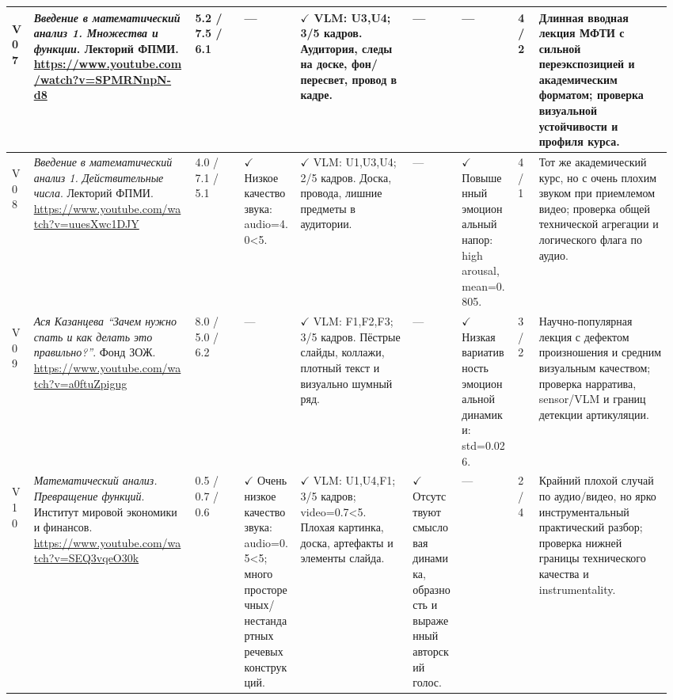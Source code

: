 \begin{landscape}
\begin{longtable}{
L{0.035\linewidth}
L{0.235\linewidth}|
L{0.075\linewidth}|
L{0.085\linewidth}
L{0.160\linewidth}
L{0.070\linewidth}
L{0.085\linewidth}|
L{0.035\linewidth}|
L{0.190\linewidth}
}
\midrule

\hypertarget{vid:v07}{V07} &
\textit{Введение в математический анализ 1. Множества и функции}. Лекторий ФПМИ. {\tiny\url{https://www.youtube.com/watch?v=SPMRNnpN-d8}} &
5.2 / 7.5 / 6.1 &
--- &
$\checkmark$ VLM: U3,U4; 3/5 кадров. Аудитория, следы на доске, фон/пересвет, провод в кадре. &
--- &
--- &
4 / 2 &
Длинная вводная лекция МФТИ с сильной переэкспозицией и академическим форматом; проверка визуальной устойчивости и профиля курса. \\

\midrule

\hypertarget{vid:v08}{V08} &
\textit{Введение в математический анализ 1. Действительные числа}. Лекторий ФПМИ. {\tiny\url{https://www.youtube.com/watch?v=uuesXwc1DJY}} &
4.0 / 7.1 / 5.1 &
$\checkmark$ Низкое качество звука: audio=4.0<5. &
$\checkmark$ VLM: U1,U3,U4; 2/5 кадров. Доска, провода, лишние предметы в аудитории. &
--- &
$\checkmark$ Повышенный эмоциональный напор: high arousal, mean=0.805. &
4 / 1 &
Тот же академический курс, но с очень плохим звуком при приемлемом видео; проверка общей технической агрегации и логического флага по аудио. \\

\midrule

\hypertarget{vid:v09}{V09} &
\textit{Ася Казанцева ``Зачем нужно спать и как делать это правильно?''}. Фонд ЗОЖ. {\tiny\url{https://www.youtube.com/watch?v=a0ftuZpigug}} &
8.0 / 5.0 / 6.2 &
--- &
$\checkmark$ VLM: F1,F2,F3; 3/5 кадров. Пёстрые слайды, коллажи, плотный текст и визуально шумный ряд. &
--- &
$\checkmark$ Низкая вариативность эмоциональной динамики: std=0.026.&
3 / 2 &
Научно-популярная лекция с дефектом произношения и средним визуальным качеством; проверка нарратива, sensor/VLM и границ детекции артикуляции. \\

\midrule

\hypertarget{vid:v10}{V10} &
\textit{Математический анализ. Превращение функций}. Институт мировой экономики и финансов. {\tiny\url{https://www.youtube.com/watch?v=SEQ3vqeO30k}} &
0.5 / 0.7 / 0.6 &
$\checkmark$ Очень низкое качество звука: audio=0.5<5; много просторечных/нестандартных речевых конструкций. &
$\checkmark$ VLM: U1,U4,F1; 3/5 кадров; video=0.7<5. Плохая картинка, доска, артефакты и элементы слайда. &
$\checkmark$ Отсутствуют смысловая динамика, образность и выраженный авторский голос.&
--- &
2 / 4 &
Крайний плохой случай по аудио/видео, но ярко инструментальный практический разбор; проверка нижней границы технического качества и instrumentality. \\


\end{longtable}
\end{landscape}
